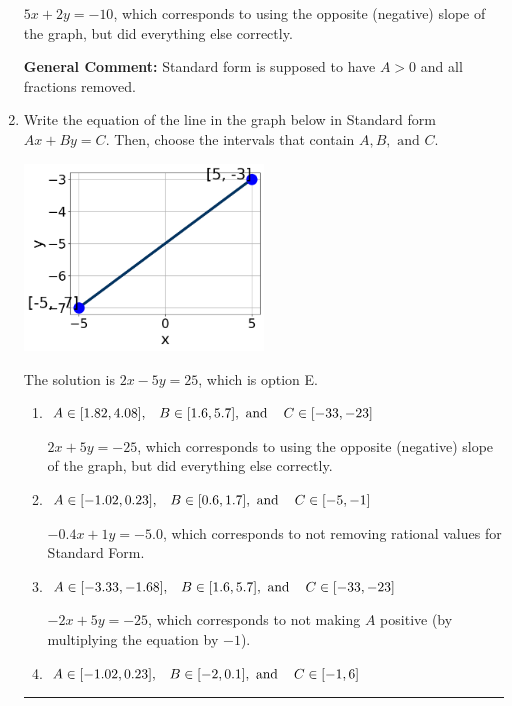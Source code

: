 \documentclass{extbook}[14pt]
\newcommand{\litem}[1]{\item #1

\rule{\textwidth}{0.4pt}}
\begin{document}
\begin{enumerate}
{\begin{enumerate}[label=\Alph*.]
 $5x + 2y = -10$, which corresponds to using the opposite (negative) slope of the graph, but did everything else correctly.
\end{enumerate}

\textbf{General Comment:} Standard form is supposed to have $A > 0$ and all fractions removed.
}
\litem{
Write the equation of the line in the graph below in Standard form $Ax+By=C$. Then, choose the intervals that contain $A, B, \text{ and } C$.

\begin{center}
    \includegraphics[width=0.5\textwidth]{../Figures/linearGraphToStandardCopyA.png}
\end{center}




The solution is \( 2x - 5y = 25 \), which is option E.\begin{enumerate}[label=\Alph*.]
\item \( A \in [1.82, 4.08], \hspace{3mm} B \in [1.6, 5.7], \text{ and } \hspace{3mm} C \in [-33, -23] \)

 $2x + 5y = -25$, which corresponds to using the opposite (negative) slope of the graph, but did everything else correctly.
\item \( A \in [-1.02, 0.23], \hspace{3mm} B \in [0.6, 1.7], \text{ and } \hspace{3mm} C \in [-5, -1] \)

 $-0.4x + 1y = -5.0$, which corresponds to not removing rational values for Standard Form.
\item \( A \in [-3.33, -1.68], \hspace{3mm} B \in [1.6, 5.7], \text{ and } \hspace{3mm} C \in [-33, -23] \)

 $-2x + 5y = -25$, which corresponds to not making $A$ positive (by multiplying the equation by $-1$).
\item \( A \in [-1.02, 0.23], \hspace{3mm} B \in [-2, 0.1], \text{ and } \hspace{3mm} C \in [-1, 6] \)


\end{enumerate}}
\end{enumerate}
\end{document}
